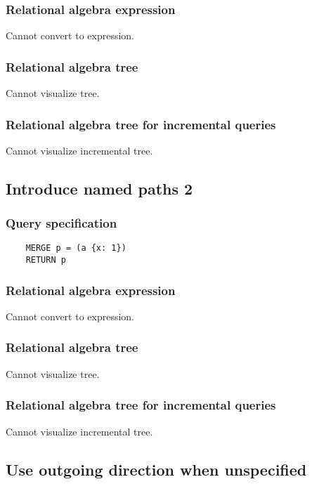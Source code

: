	\subsubsection*{Relational algebra expression}

	Cannot convert to expression.

	\subsubsection*{Relational algebra tree}

	Cannot visualize tree.

	\subsubsection*{Relational algebra tree for incremental queries}

	Cannot visualize incremental tree.
	\subsection{Introduce named paths 2}

	\subsubsection*{Query specification}

	\begin{lstlisting}
	MERGE p = (a {x: 1})
	RETURN p
	\end{lstlisting}


	\subsubsection*{Relational algebra expression}

	Cannot convert to expression.

	\subsubsection*{Relational algebra tree}

	Cannot visualize tree.

	\subsubsection*{Relational algebra tree for incremental queries}

	Cannot visualize incremental tree.
	\subsection{Use outgoing direction when unspecified}

